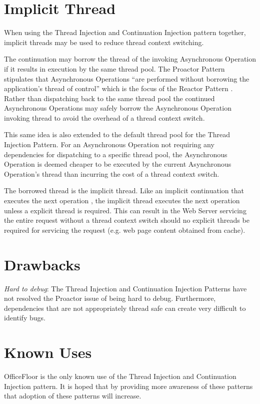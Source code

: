 \documentclass{article}
\begin{document}
\section{Implicit Thread}

When using the Thread Injection and Continuation Injection pattern together,
implicit threads may be used to reduce thread context switching.

The continuation may borrow the thread of the invoking Asynchronous Operation if
it results in execution by the same thread pool.  The Proactor Pattern
stipulates that Asynchronous Operations ``are performed without borrowing the
application's thread of control'' which is the focus of the Reactor Pattern
\cite{reactor}.  Rather than dispatching back to the same thread pool the
continued Asynchronous Operations may safely borrow the Asynchronous Operation
invoking thread to avoid the overhead of a thread context switch.

This same idea is also extended to the default thread pool for the Thread
Injection Pattern.  For an Asynchronous Operation not requiring any dependencies
for dispatching to a specific thread pool, the Asynchronous Operation is deemed
cheaper to be executed by the current Asynchronous Operation's thread than
incurring the cost of a thread context switch.

The borrowed thread is the implicit thread.  Like an implicit continuation that
executes the next operation \cite{continuations}, the implicit thread executes
the next operation unless a explicit thread is required.  This can result in the
Web Server servicing the entire request without a thread context switch should
no explicit threads be required for servicing the request (e.g. web page content
obtained from cache).


\section{Drawbacks}

\emph{Hard to debug}: The Thread Injection and Continuation Injection Patterns
have not resolved the Proactor issue of being hard to debug.  Furthermore,
dependencies that are not appropriately thread safe can create very difficult to
identify bugs.

\section{Known Uses}

OfficeFloor is the only known use of the Thread Injection and Continuation
Injection pattern.  It is hoped that by providing more awareness of these
patterns that adoption of these patterns will increase.




\end{document}
